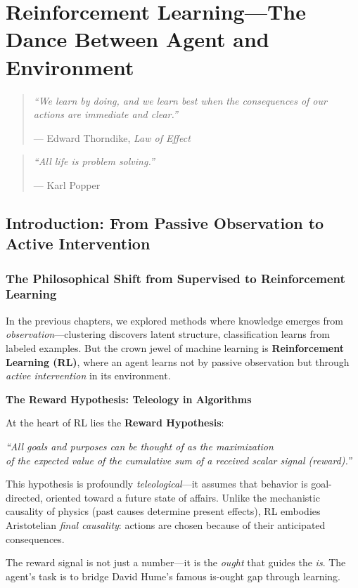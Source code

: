 \chapter{Reinforcement Learning---The Dance Between Agent and Environment}

\begin{quote}
    \itshape
    ``We learn by doing, and we learn best when the consequences of our actions are immediate and clear.''
    
    \raggedleft--- Edward Thorndike, \textit{Law of Effect}
\end{quote}

\begin{quote}
    \itshape
    ``All life is problem solving.''
    
    \raggedleft--- Karl Popper
\end{quote}

\section{Introduction: From Passive Observation to Active Intervention}

\subsection{The Philosophical Shift from Supervised to Reinforcement Learning}

In the previous chapters, we explored methods where knowledge emerges from \textit{observation}---clustering discovers latent structure, classification learns from labeled examples. But the crown jewel of machine learning is \textbf{Reinforcement Learning (RL)}, where an agent learns not by passive observation but through \textit{active intervention} in its environment.

\begin{philobox}
\textbf{The Reward Hypothesis: Teleology in Algorithms}

At the heart of RL lies the \textbf{Reward Hypothesis}:

\begin{center}
\itshape
``All goals and purposes can be thought of as the maximization \\
of the expected value of the cumulative sum of a received scalar signal (reward).''
\end{center}

This hypothesis is profoundly \textit{teleological}---it assumes that behavior is goal-directed, oriented toward a future state of affairs. Unlike the mechanistic causality of physics (past causes determine present effects), RL embodies Aristotelian \textit{final causality}: actions are chosen because of their anticipated consequences.

The reward signal is not just a number---it is the \textit{ought} that guides the \textit{is}. The agent's task is to bridge David Hume's famous is-ought gap through learning.
\end{philobox}

